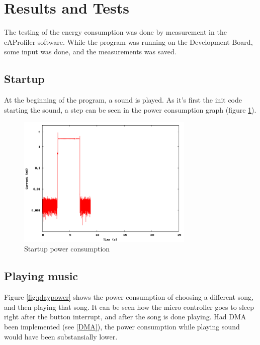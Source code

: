 \section{Results and Tests}

The testing of the energy consumption was done by measurement in the eAProfiler software.
While the program was running on the Development Board, some input was done, and the measurements was saved.

\subsection{Startup}

At the beginning of the program, a sound is played. 
As it's first the init code starting the sound, a step can be seen in the power consumption graph (figure \ref{fig:startuppower}).
\begin{figure}[H]
\centering
\includegraphics[width=0.75\textwidth]{data/startup.png}
\caption{Startup power consumption}
\label{fig:startuppower}
\end{figure}

\subsection{Playing music}
Figure \ref{fig:playpower} shows the power consumption of choosing a different song, and then playing that song.
It can be seen how the micro controller goes to sleep right after the button interrupt, and after the song is done playing.
Had DMA been implemented (see \vref{DMA}), the power consumption while playing sound would have been substansially lower.

